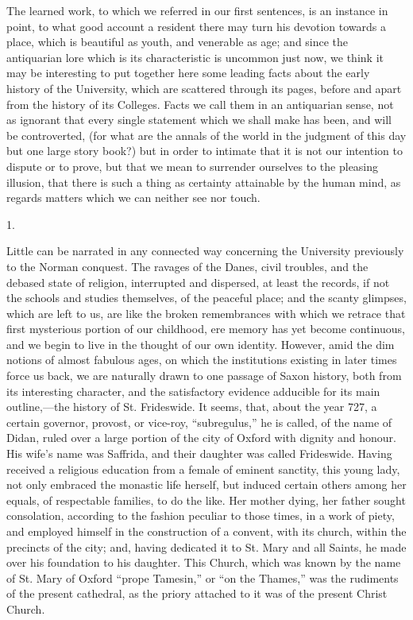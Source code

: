 The learned work, to which we
referred in our first sentences, is an instance in point, to what good
account a resident there may turn his devotion towards a place, which
is beautiful as youth, and venerable as age; and since the antiquarian
lore which is its characteristic is uncommon just now, we think
it may be interesting to put together here some leading facts about
the early history of the University, which are scattered through its
pages, before and apart from the history of its Colleges. Facts we
call them in an antiquarian sense, not as ignorant that every single
statement which we shall make has been, and will be controverted, (for
what are the annals of the world in the judgment of this day but one
large story book?) but in order to intimate that it is not our
intention to dispute or to prove, but that we mean to surrender
ourselves to the pleasing illusion, that there is such a thing as
certainty attainable by the human mind, as regards matters which we
can neither see nor touch.

1.

Little can be narrated in any
connected way concerning the University previously to the Norman
conquest. The ravages of the Danes, civil troubles, and the debased
state of religion, interrupted and dispersed, at least the records, if
not the schools and studies themselves, of the peaceful place; and the
scanty glimpses, which are left to us, are like the broken
remembrances with which we retrace that first mysterious portion of
our childhood, ere memory has yet become continuous, and we begin to
live in the thought of our own identity. However, amid the dim notions
of almost fabulous ages, on which the institutions existing in later
times force us back, we are naturally drawn to one passage of Saxon
history, both from its interesting character, and the satisfactory
evidence adducible for its main outline,—the history of St. Frideswide.
It seems, that, about the year 727, a certain governor, provost, or
vice-roy, ``subregulus,'' he is called, of the name of Didan, ruled over
a large portion of the city of Oxford with dignity and honour.
His wife's name was Saffrida, and their daughter was called Frideswide.
Having received a religious education from a female of eminent
sanctity, this young lady, not only embraced the monastic life
herself, but induced certain others among her equals, of respectable
families, to do the like. Her mother dying, her father sought
consolation, according to the fashion peculiar to those times, in a
work of piety, and employed himself in the construction of a convent,
with its church, within the precincts of the city; and, having
dedicated it to St. Mary and all Saints, he made over his foundation
to his daughter. This Church, which was known by the name of St. Mary
of Oxford ``prope Tamesin,'' or ``on the Thames,'' was the rudiments of
the present cathedral, as the priory attached to it was of the present
Christ Church.

